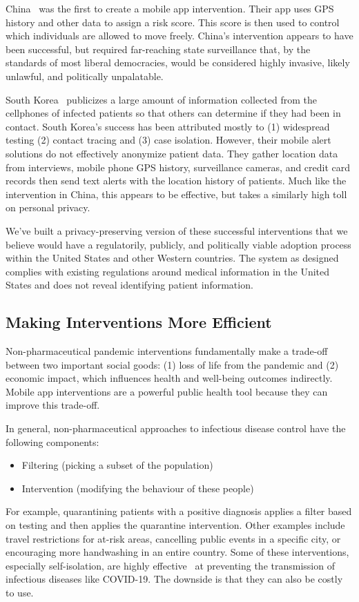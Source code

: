 \documentclass[11pt]{article}
\begin{document}
China~\cite{mcneil_2020} was the first to create a mobile app intervention. Their app uses GPS history and other data to assign a risk score. This score is then used to control which individuals are allowed to move freely. China’s intervention appears to have been successful, but required far-reaching state surveillance that, by the standards of most liberal democracies, would be considered highly invasive, likely unlawful, and politically unpalatable.


South Korea~\cite{normile_2020} publicizes a large amount of information collected from the cellphones of infected patients so that others can determine if they had been in contact. South Korea’s success has been attributed mostly to (1) widespread testing (2) contact tracing and (3) case isolation. However, their mobile alert solutions do not effectively anonymize patient data. They gather location data from interviews, mobile phone GPS history, surveillance cameras, and credit card records then send text alerts with the location history of patients. Much like the intervention in China, this appears to be effective, but takes a similarly high toll on personal privacy.


We’ve built a privacy-preserving version of these successful interventions that we believe would have a regulatorily, publicly, and politically viable adoption process within the United States and other Western countries. The system as designed complies with existing regulations around medical information in the United States and does not reveal identifying patient information. 


\subsection{Making Interventions More Efficient}

Non-pharmaceutical pandemic interventions fundamentally make a trade-off between two important social goods: (1) loss of life from the pandemic and (2) economic impact, which influences health and well-being outcomes indirectly. Mobile app interventions are a powerful public health tool because they can improve this trade-off.


In general, non-pharmaceutical approaches to infectious disease control have the following components:
\begin{itemize}
\item Filtering (picking a subset of the population)
\item Intervention (modifying the behaviour of these people)
\end{itemize}
For example, quarantining patients with a positive diagnosis applies a filter based on testing and then applies the quarantine intervention. Other examples include travel restrictions for at-risk areas, cancelling public events in a specific city, or encouraging more handwashing in an entire country. Some of these interventions, especially self-isolation, are highly effective~\cite{ferguson} at preventing the transmission of infectious diseases like COVID-19. The downside is that they can also be costly to use.
\end{document}
